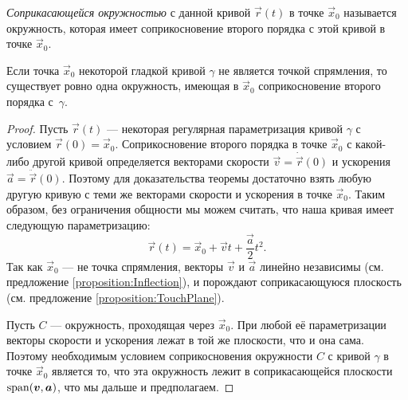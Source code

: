 \begin{definition}
	\textit{Соприкасающейся окружностью} с данной кривой $\vec{r}(t)$ в точке $\vec{x}_0$ называется окружность, которая имеет соприкосновение второго порядка с этой кривой в точке $\vec{x}_0$.
\end{definition}

\begin{theorem} \label{theorem:TouchingCircle}
	Если точка $\vec{x}_0$ некоторой гладкой кривой $\gamma$ не является точкой спрямления, то существует ровно одна окружность, имеющая в $\vec{x}_0$ соприкосновение второго порядка с~$\gamma$.
\end{theorem}

\begin{proof}
	Пусть $\vec{r}(t)$ --- некоторая регулярная параметризация кривой $\gamma$ с условием $\vec{r}(0) = \vec{x}_0$. Соприкосновение второго порядка в точке $\vec{x}_0$ с какой-либо другой кривой определяется векторами скорости $\vec{v} = \dot{\vec{r}}(0)$ и ускорения $\vec{a} = \ddot{\vec{r}}(0)$. Поэтому для доказательства теоремы достаточно взять любую другую кривую с теми же векторами скорости и ускорения в точке $\vec{x}_0$. Таким образом, без ограничения общности мы можем считать, что наша кривая имеет следующую параметризацию:
	\[
		\vec{r}(t) = \vec{x}_0 + \vec{v}t + \frac{\vec{a}}{2}t^2.
	\]
	Так как $\vec{x}_0$ --- не точка спрямления, векторы $\vec{v}$ и $\vec{a}$ линейно независимы (см. предложение \ref{proposition:Inflection}), и порождают соприкасающуюся плоскость (см. предложение \ref{proposition:TouchPlane}).

	Пусть $C$ --- окружность, проходящая через $\vec{x}_0$. При любой её параметризации векторы скорости и ускорения лежат в той же плоскости, что и она сама. Поэтому необходимым условием соприкосновения окружности $C$ с кривой $\gamma$ в точке $\vec{x}_0$ является то, что эта окружность лежит в соприкасающейся плоскости $\operatorname{span}(\boldsymbol{v}, \boldsymbol{a})$, что мы дальше и предполагаем.


\end{proof}
